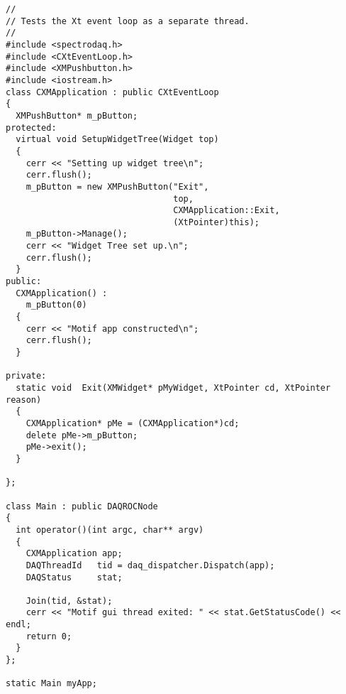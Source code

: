 \footnotesize\begin{verbatim}//
// Tests the Xt event loop as a separate thread.
//
#include <spectrodaq.h>
#include <CXtEventLoop.h>
#include <XMPushbutton.h>
#include <iostream.h>
class CXMApplication : public CXtEventLoop
{
  XMPushButton* m_pButton;
protected:
  virtual void SetupWidgetTree(Widget top)
  {
    cerr << "Setting up widget tree\n";
    cerr.flush();
    m_pButton = new XMPushButton("Exit",
                                 top,
                                 CXMApplication::Exit,
                                 (XtPointer)this);
    m_pButton->Manage();
    cerr << "Widget Tree set up.\n";
    cerr.flush();
  }
public:
  CXMApplication() :
    m_pButton(0)
  {
    cerr << "Motif app constructed\n";
    cerr.flush();
  }

private:
  static void  Exit(XMWidget* pMyWidget, XtPointer cd, XtPointer reason)
  {
    CXMApplication* pMe = (CXMApplication*)cd;
    delete pMe->m_pButton;
    pMe->exit();
  }

};

class Main : public DAQROCNode
{
  int operator()(int argc, char** argv)
  {
    CXMApplication app;
    DAQThreadId   tid = daq_dispatcher.Dispatch(app);
    DAQStatus     stat;

    Join(tid, &stat);
    cerr << "Motif gui thread exited: " << stat.GetStatusCode() << endl;
    return 0;
  }
};

static Main myApp;
\end{verbatim}\normalsize 


